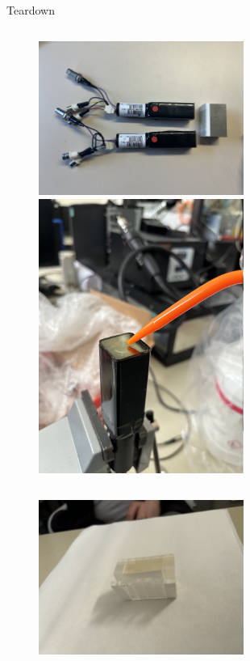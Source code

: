 \begin{columnframe}{Teardown}
    \begin{column}{0.5\textwidth}
        \begin{figure}
            \centering
            \includegraphics[width=0.6\textwidth, frame]{images/photonis_teardown_4.JPG}
            \includegraphics[trim=0 200 0 1800, clip, width=0.6\textwidth, frame]{images/PMT_iso_wipe.JPG}
        \end{figure}
    \end{column}
    \begin{column}{0.5\textwidth}
        \begin{figure}
            \centering
            \includegraphics[width=0.6\textwidth, frame]{images/crystals_pack_2.JPG}

\end{figure}
\end{column}
\end{columnframe}
